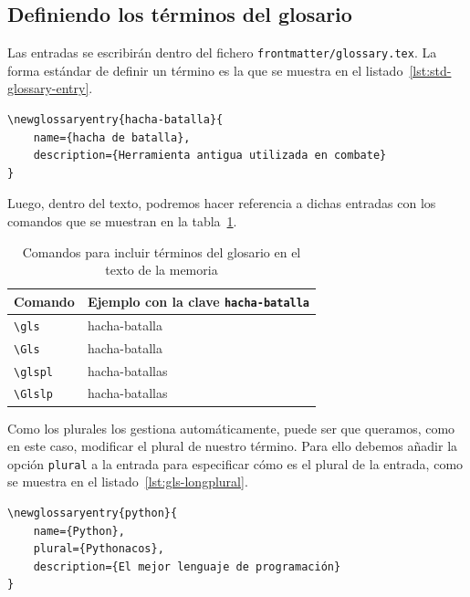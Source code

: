 \subsection{Definiendo los términos del glosario}

Las entradas se escribirán dentro del fichero \texttt{frontmatter/glossary.tex}. La forma estándar de definir un término es la que se muestra en el listado~\ref{lst:std-glossary-entry}.

\begin{lstlisting}[language={[latex]TeX},caption=Código para crear una entrada en el glosario,label=lst:std-glossary-entry]
\newglossaryentry{hacha-batalla}{
    name={hacha de batalla},
    description={Herramienta antigua utilizada en combate}
}
\end{lstlisting}

Luego, dentro del texto, podremos hacer referencia a dichas entradas con los comandos que se muestran en la tabla~\ref{tab:glossary-commands}.

\begin{table}
    \caption{\label{tab:glossary-commands}Comandos para incluir términos del glosario en el texto de la memoria}
    \begin{tabularx}{\textwidth}{@{}lX@{}}
        \toprule
        \textbf{Comando} & \textbf{Ejemplo con la clave \texttt{hacha-batalla}} \\
        \midrule
        \texttt{\textbackslash gls} & \gls{hacha-batalla} \\
        \texttt{\textbackslash Gls} & \Gls{hacha-batalla} \\
        \texttt{\textbackslash glspl} & \glspl{hacha-batalla} \\
        \texttt{\textbackslash Glslp} & \Glspl{hacha-batalla} \\
        \bottomrule
    \end{tabularx}
\end{table}

Como los plurales los gestiona automáticamente, puede ser que queramos, como en este caso, modificar el plural de nuestro término. Para ello debemos añadir la opción \texttt{plural} a la entrada para especificar cómo es el plural de la entrada, como se muestra en el listado~\ref{lst:gls-longplural}.

\begin{lstlisting}[language={[latex]TeX},caption=Especificando el plural para un término del glosario,label=lst:gls-longplural]
\newglossaryentry{python}{
    name={Python},
    plural={Pythonacos},
    description={El mejor lenguaje de programación}
}
\end{lstlisting}

